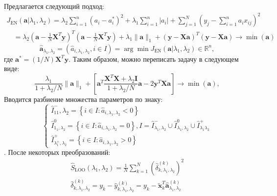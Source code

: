 \documentclass[12pt, twoside]{article}
\begin{document}
Предлагается следующий подход:
\begin{equation}
\begin{array}{l}{J_{\mathrm{EN}}\left(\mathbf{a} | \lambda_{1}, \lambda_{2}\right)=\lambda_{2} \sum_{i=1}^{n}\left(a_{i}-a_{i}^{*}\right)^{2}+\lambda_{1} \sum_{i=1}^{n}\left|a_{i}\right|+\sum_{j=1}^{N}\left(y_{j}-\sum_{i=1}^{n} a_{i} x_{i j}\right)^{2}} \\ {\quad=\lambda_{2}\left(\mathbf{a}-\frac{1}{N} \mathbf{X}^{T} \mathbf{y}\right)^{T}\left(\mathbf{a}-\frac{1}{N} \mathbf{X}^{T} \mathbf{y}\right)+\lambda_{1}\|\mathbf{a}\|_{1}+(\mathbf{y}-\mathbf{X} \mathbf{a})^{T}(\mathbf{y}-\mathbf{X} \mathbf{a}) \rightarrow \min (\mathbf{a})}\end{array}
\end{equation}
\begin{equation}
\hat{\mathbf{a}}_{\lambda_{1}, \lambda_{2}}=\left(\hat{a}_{i, \lambda_{1}, \lambda_{2}}, i \in I\right)=\arg \min J_{\mathrm{EN}}\left(\mathbf{a} | \lambda_{1}, \lambda_{2}\right) \in \mathbb{R}^{n},
\end{equation}
где $\mathbf{a}^{*}=(1 / N) \mathbf{X}^{T} \mathbf{y}$. Таким образом, можно переписать задачу в следующем виде:
\begin{equation}
\frac{\lambda_{1}}{1+\lambda_{2} / N}\|\mathbf{a}\|_{1}+\left[\mathbf{a}^{T} \frac{\mathbf{X}^{T} \mathbf{X}+\lambda_{2} \mathbf{I}}{1+\lambda_{2} / N} \mathbf{a}-2 \mathbf{y}^{T} \mathbf{X} \mathbf{a}\right] \rightarrow \min (\mathbf{a}),
\end{equation}
Вводится разбиение множества параметров по знаку:
\begin{equation}
\left\{\begin{array}{l}
{\hat{I}_{11}^{-}, \lambda_{2}=\left\{i \in I: \hat{a}_{i, \lambda_{1}, \lambda_{2}}<0\right\}} \\
{\hat{I}_{1_{1}, \lambda_{2}}^{0}=\left\{i \in I: \hat{a}_{i, \lambda_{1}, \lambda_{2}}=0\right\}, I=\hat{I}_{\lambda_{1}, \lambda_{2}}^{-} \cup \hat{I}_{\lambda_{1}, \lambda_{2}}^{0} \cup \hat{I}_{\lambda_{1} \lambda_{2}}^{+}} \\
{\hat{I}_{\lambda_{1}^{+}, \lambda_{2}}^{+}=\left\{i \in I: \hat{a}_{i, \lambda_{1}, \lambda_{2}}>0\right\}}
\end{array}\right.
\end{equation}.
После некоторых преобразований:
\begin{equation}
\begin{array}{c}
{\hat{S}_{\mathrm{LOO}}\left(\lambda_{1}, \lambda_{2}\right)=\frac{1}{N} \sum_{k=1}^{N}\left(\hat{\delta}_{k, \lambda_{1}, \lambda_{2}}^{(k)}\right)^{2}} \\
{\hat{\delta}_{k, \lambda_{1}, \lambda_{2}}^{(k)}=y_{k}-\hat{y}_{k, \lambda_{1}, \lambda_{2}}^{(k)}=y_{k}-\tilde{\mathbf{x}}_{k}^{T} \hat{\mathbf{a}}_{\lambda_{1}, \lambda_{2}}^{(k)}}
\end{array}
\end{equation}
\end{document}
